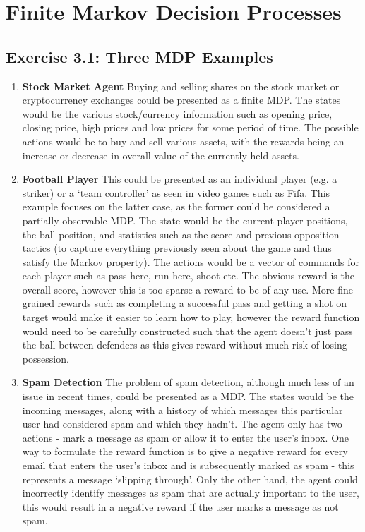 \section{Finite Markov Decision Processes}

\subsection*{Exercise 3.1: Three MDP Examples}

\begin{enumerate}
	\item \textbf{Stock Market Agent} Buying and selling shares on the stock market or cryptocurrency exchanges could be presented as a finite MDP. The states would be the various stock/currency information such as opening price, closing price, high prices and low prices for some period of time. The possible actions would be to buy and sell various assets, with the rewards being an increase or decrease in overall value of the currently held assets.
	\item \textbf{Football Player} This could be presented as an individual player (e.g. a striker) or a `team controller' as seen in video games such as Fifa. This example focuses on the latter case, as the former could be considered a partially observable MDP. The state would be the current player positions, the ball position, and statistics such as the score and previous opposition tactics (to capture everything previously seen about the game and thus satisfy the Markov property). The actions would be a vector of commands for each player such as pass here, run here, shoot etc. The obvious reward is the overall score, however this is too sparse a reward to be of any use. More fine-grained rewards such as completing a successful pass and getting a shot on target would make it easier to learn how to play, however the reward function would need to be carefully constructed such that the agent doesn't just pass the ball between defenders as this gives reward without much risk of losing possession.
	\item \textbf{Spam Detection} The problem of spam detection, although much less of an issue in recent times, could be presented as a MDP. The states would be the incoming messages, along with a history of which messages this particular user had considered spam and which they hadn't. The agent only has two actions - mark a message as spam or allow it to enter the user's inbox. One way to formulate the reward function is to give a negative reward for every email that enters the user's inbox and is subsequently marked as spam - this represents a message `slipping through'. Only the other hand, the agent could incorrectly identify messages as spam that are actually important to the user, this would result in a negative reward if the user marks a message as not spam.   
\end{enumerate}


